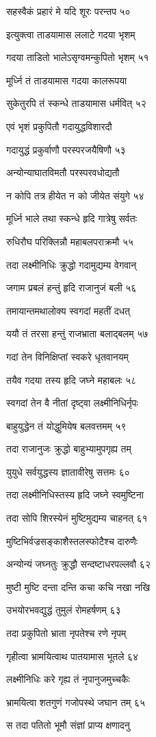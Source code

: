 सहस्वैकं प्रहारं मे यदि शूरः परन्तप ५०

इत्युक्त्वा ताडयामास ललाटे गदया भृशम्

गदया ताडितो भालेऽसृग्वमन्कुपितो भृशम् ५१

मूर्ध्नि तं ताडयामास गदया कालरूपया

सुकेतुरपि तं स्कन्धे ताडयामास धर्मवित् ५२

एवं भृशं प्रकुपितौ गदायुद्धविशारदौ

गदायुद्धं प्रकुर्वाणौ परस्परजयैषिणौ ५३

अन्योन्याघातविमतौ परस्परवधोद्यतौ

न कोपि तत्र हीयेत न को जीयेत संयुगे ५४

मूर्ध्नि भाले तथा स्कन्धे हृदि गात्रेषु सर्वतः

रुधिरौघ परिक्लिन्नौ महाबलपराक्रमौ ५५

तदा लक्ष्मीनिधिः क्रुद्धो गदामुद्यम्य वेगवान्

जगाम प्रबलं हन्तुं हृदि राजानुजं बली ५६

तमायान्तमथालोक्य स्वगदां महतीं दधत्

ययौ तं तरसा हन्तुं राजभ्राता बलाद्बलम् ५७

गदां तेन विनिक्षिप्तां स्वकरे धृतवानयम्

तयैव गदया तस्य हृदि जघ्ने महाबलः ५८

स्वगदां तेन वै नीतां दृष्ट्वा लक्ष्मीनिधिर्नृपः

बाहुयुद्धेन तं योद्धुमियेष बलवत्तमम् ५९

तदा राजानुजः क्रुद्धो बाहुभ्यामुपगृह्य तम्

युयुधे सर्वयुद्धस्य ज्ञातावीरेषु सत्तमः ६०

तदा लक्ष्मीनिधिस्तस्य हृदि जघ्ने स्वमुष्टिना

तदा सोपि शिरस्येनं मुष्टिमुद्यम्य चाहनत् ६१

मुष्टिभिर्वज्रसङ्काशैस्तलस्फोटैश्च दारुणैः

अन्योन्यं जघ्नतुः क्रुद्धौ सन्दष्टाधरपल्लवौ ६२

मुष्टी मुष्टि दन्ता दन्ति कचा कचि नखा नखि

उभयोरभवद्युद्धं तुमुलं रोमहर्षणम् ६३

तदा प्रकुपितो भ्राता नृपतेश्च रणे नृपम्

गृहीत्वा भ्रामयित्वाथ पातयामास भूतले ६४

लक्ष्मीनिधिः करे गृह्य तं नृपानुजमुच्चकैः

भ्रामयित्वा शतगुणं गजोपस्थे जघान तम् ६५

स तदा पतितो भूमौ संज्ञां प्राप्य क्षणादनु

